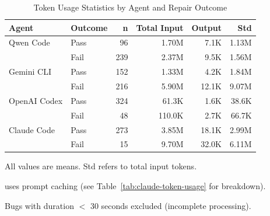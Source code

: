 \begin{table}[t]
\centering
\caption{Token Usage Statistics by Agent and Repair Outcome}
\label{tab:token-usage-statistics}
\begin{tabular}{@{}llrrrr@{}}
\toprule
\textbf{Agent} & \textbf{Outcome} & \textbf{n} & \textbf{Total Input} & \textbf{Output} & \textbf{Std} \\
\midrule
Qwen Code & Pass & 96 & 1.70M & 7.1K & 1.13M \\
            & Fail & 239 & 2.37M & 9.5K & 1.56M \\
\midrule
Gemini CLI & Pass & 152 & 1.33M & 4.2K & 1.84M \\
            & Fail & 216 & 5.90M & 12.1K & 9.07M \\
\midrule
OpenAI Codex & Pass & 324 & 61.3K & 1.6K & 38.6K \\
            & Fail & 48 & 110.0K & 2.7K & 66.7K \\
\midrule
Claude Code & Pass & 273 & 3.85M & 18.1K & 2.99M \\
            & Fail & 15 & 9.70M & 32.0K & 6.11M \\
\bottomrule
\end{tabular}
\begin{tablenotes}
\small
\item All values are means. Std refers to total input tokens.
\item \claudecode uses prompt caching (see Table~\ref{tab:claude-token-usage} for breakdown).
\item Bugs with duration $<$ 30 seconds excluded (incomplete processing).
\end{tablenotes}
\end{table}
